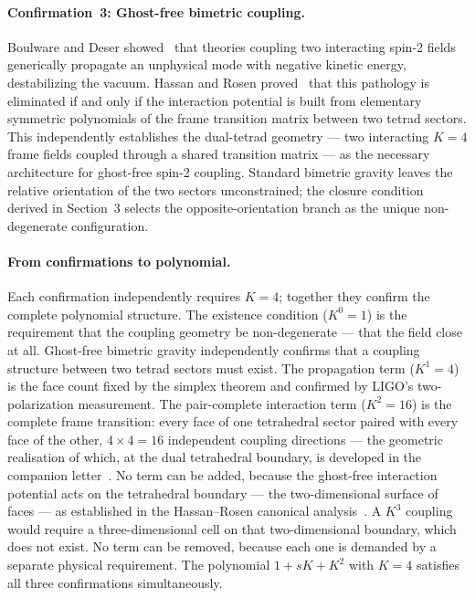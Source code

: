 \documentclass[a4paper,11pt]{article}
\begin{document}
\paragraph{Confirmation~3: Ghost-free bimetric coupling.}
Boulware and Deser showed~\cite{BD1972} that theories
coupling two interacting spin-2 fields generically
propagate an unphysical mode with negative kinetic energy,
destabilizing the vacuum. Hassan and Rosen
proved~\cite{HR2012a,HR2012b} that this pathology is
eliminated if and only if the interaction potential is
built from elementary symmetric polynomials of the frame
transition matrix between two tetrad sectors. This
independently establishes the dual-tetrad geometry ---
two interacting $K = 4$ frame fields coupled through a
shared transition matrix --- as the necessary architecture
for ghost-free spin-2 coupling. Standard bimetric gravity
leaves the relative orientation of the two sectors
unconstrained; the closure condition derived in Section~3
selects the opposite-orientation branch as the unique
non-degenerate configuration.

\paragraph{From confirmations to polynomial.}
Each confirmation independently requires $K = 4$; together
they confirm the complete polynomial structure. The
existence condition ($K^0 = 1$) is the requirement that
the coupling geometry be non-degenerate --- that the
field close at all. Ghost-free bimetric gravity
independently confirms that a coupling structure between
two tetrad sectors must exist. The propagation term
($K^1 = 4$) is the face count fixed by the simplex
theorem and confirmed by LIGO's two-polarization
measurement. The pair-complete interaction term
($K^2 = 16$) is the complete frame transition: every
face of one tetrahedral sector paired with every face
of the other, $4 \times 4 = 16$ independent coupling
directions --- the geometric realisation of which, at the
dual tetrahedral boundary, is developed in the companion
letter~\cite{Nelson2026b}. No term can be added, because the ghost-free
interaction potential acts on the tetrahedral boundary
--- the two-dimensional surface of faces --- as
established in the Hassan--Rosen canonical
analysis~\cite{Alexandrov2013}. A $K^3$ coupling would
require a three-dimensional cell on that two-dimensional
boundary, which does not exist. No term can be removed,
because each one is demanded by a separate physical
requirement. The polynomial $1 + sK + K^2$ with $K = 4$
satisfies all three confirmations simultaneously.
\end{document}
